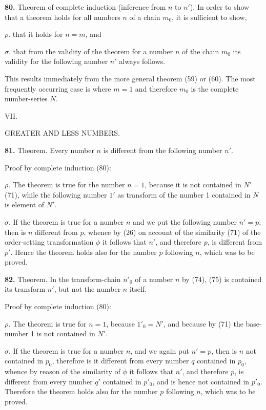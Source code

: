 \documentclass[oneside]{book}
\makeatletter
\newcommand\mypara{\medskip\textbf}
\newcommand\mysect[3]{
\medskip\begin{center}{\large #2.}\end{center}
\begin{center}\uppercase{#3.}\end{center}
\addcontentsline{toc}{section}{\protect\phantom{#1}#2\@. #3}
}
\makeatother
\begin{document}
\mypara{80.} Theorem of complete induction (inference
from $n$ to $n'$). In order to show that a theorem holds
for all numbers $n$ of a chain $m_0$, it is sufficient to show,

$\rho$. that it holds for $n=m$, and

$\sigma$. that from the validity of the theorem for a number
$n$ of the chain $m_0$ its validity for the following
number $n'$ always follows.

This results immediately from the more general
theorem (59) or (60). The most frequently occurring
case is where $m = 1$ and therefore $m_0$ is the complete
number-series $N$.


\mysect{XI}{VII}{Greater and Less Numbers}

\mypara{81.} Theorem. Every number $n$ is different from
the following number $n'$.

Proof by complete induction (80):

$\rho$. The theorem is true for the number $n = 1$, because
it is not contained in $N'$ (71), while the following
number $1'$ as transform of the number 1 contained
in $N$ is element of $N'$.

$\sigma$. If the theorem is true for a number $n$ and we
put the following number $n' = p$, then is $n$ different
from $p$, whence by (26) on account of the similarity
(71) of the order-setting transformation $\phi$ it follows
that $n'$, and therefore $p$, is different from $p'$. Hence
the theorem holds also for the number $p$ following $n$,
which was to be proved.

\mypara{82.} Theorem. In the transform-chain $n'_0$  of a number
$n$ by (74), (75) is contained its transform $n'$, but
not the number $n$ itself.

Proof by complete induction (80):

$\rho$. The theorem is true for $n = 1$, because $1'_0 = N'$,
and because by (71) the base-number 1 is not contained
in $N'$.

$\sigma$. If the theorem is true for a number $n$, and we
again put $n' =p$, then is $n$ not contained in $p_0$, therefore
is it different from every number $q$ contained in
$p_0$, whence by reason of the similarity of $\phi$ it follows
that $n'$, and therefore $p$, is different from every number
$q'$ contained in $p'_0$, and is hence not contained in
$p'_0$. Therefore the theorem holds also for the number
$p$ following $n$, which was to be proved.
\end{document}
